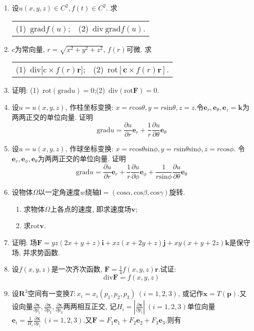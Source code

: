 \begin{enumerate}
	\item 设$u(x,y,z)\in C^2, f(t)\in C^2$. 求
	\begin{table}[H]
		\begin{tabular}{ll}
		  \qquad	(1)\ $\mathrm{grad}f(u)$;\qquad \qquad \qquad \quad & (2)\ $\mathrm{div\ grad}f(u)$.
		\end{tabular}
	\end{table}
\item $c$为常向量, $r=\sqrt{x^2+y^2+z^2}$, $f(r)$可微. 求
	\begin{table}[H]
		\begin{tabular}{ll}
			(1)\ $\mathrm{div}$[$\mathrm{c}\times f(r)\bm{r}$];\qquad \qquad \qquad \qquad &(2)\ $\mathrm{rot}[\bm{c}\times f(r)\bm{r}]$.
		\end{tabular}
	\end{table}
\item 证明: \qquad  (1)\ $\mathrm{rot}(\mathrm{grad}u)=0$;\qquad \qquad \qquad (2)\ $\mathrm{div}(\mathrm{rot}\bm{F})=0$.
\item 设$u=u(x,y,z)$, 作柱坐标变换: $x=r\mathrm{cos}\theta,y=r\mathrm{sin}\theta,z=z$.令$\bm{e}_r,\bm{e}_\theta,\bm{e}_z=\bm{k}$为两两正交的单位向量. 证明
$$\mathrm{grad}u = \frac{\partial u}{\partial r}\bm{e}_r +\frac{1}{r}\frac{\partial u}{\partial \theta}\bm{e}_\theta$$
\item 设$u=u(x,y,z)$, 作球坐标变换: $x=r\mathrm{cos}\theta\mathrm{sin}\phi,y=r\mathrm{sin}\theta\mathrm{sin}\phi,z=r\mathrm{cos}\phi$. 令$\bm{e}_r,\bm{e}_\phi,\bm{e}_\theta$为两两正交的单位向量. 证明
$$ \mathrm{grad}u=\frac{\partial u}{\partial r}\bm{e}_r+\frac{1}{r}\frac{\partial u}{\partial \phi}\bm{e}_\phi+\frac{1}{r\mathrm{sin}\phi}\frac{\partial u}{\partial \theta}\bm{e}_\theta$$
\item 设物体$\Omega$以一定角速度$w$绕轴$\bm{l}=(\mathrm{cos}\alpha,\mathrm{cos}\beta,\mathrm{cos}\gamma)$旋转.
\begin{enumerate}
	\item 求物体$\Omega$上各点的速度, 即求速度场$\bm{v}$;
	\item 求$\mathrm{rot}\bm{v}$.
\end{enumerate}
\item 证明: 场$\bm{F}=yz(2x+y+z)\bm{i}+xz(x+2y+z)\bm{j}+xy(x+y+2z)\bm{k}$是保守场, 并求势函数.
	\item 设$f(x,y,z)$是一次齐次函数, $\bm{F}=\frac{1}{4}f(x,y,z)\bm{r}$.试证:
	$$\mathrm{div}\bm{F}=f(x,y,z)$$
\item 设$\bm{R}^3$空间有一变换$T: x_i=x_i(p_1,p_2,p_3)\ (i=1,2,3)$, 或记作$\bm{x}=T(\bm{p})$.又设向量$\frac{\partial \bm{x}}{\partial p_1},\frac{\partial \bm{x}}{\partial p_2},\frac{\partial \bm{x}}{\partial p_3}$两两相互正交, 记$H_i=|\frac{\partial \bm{x}}{\partial p_i}|\ (i=1,2,3)$单位向量$\bm{e}_i=\frac{1}{H_i}\frac{\partial \bm{x}}{\partial p_i}\ (i=1,2,3)$.又$\bm{F}=F_1\bm{e}_1+F_2\bm{e}_2+F_3\bm{e}_3$.则有$$
$$
\end{enumerate}
